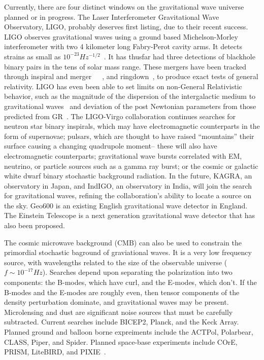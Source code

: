 Currently, there are four distinct windows on the gravitational wave universe planned or in progress. The Laser Interferometer Gravitational Wave Observatory, LIGO, probably deserves first listing, due to their recent success. LIGO observes gravitational waves using a ground based Michelson-Morley interferometer with two 4 kilometer long Fabry-Perot cavity arms. It detects strains as small as $10^{-23} Hz^{-1/2}$~\cite{LIGOsensitivity}. It has thusfar had three detections of blackhole binary pairs in the tens of solar mass range. These mergers have been tracked through inspiral and merger~\cite{GW150914}~\cite{GW151226}~\cite{GW170104}, and ringdown~\cite{LIGO1e}, to produce exact tests of general relativity. LIGO has even been able to set limits on non-General Relativistic behavior, such as the magnitude of the dispersion of the intergalactic medium to gravitational waves~\cite{GW170104} and deviation of the post Newtonian parameters from those predicted from GR~\cite{LIGO1e}. The LIGO-Virgo collaboration continues searches for neutron star binary inspirals, which may have electromagnetic counterparts in the form of supernovae; pulsars, which are thought to have raised ``mountains'' their surface causing a changing quadrupole moment-- these will also have electromagnetic counterparts; gravitational wave bursts correlated with EM, neutrino, or particle sources such as a gamma ray burst; or the cosmic or galactic white dwarf binary stochastic background radiation. In the future, KAGRA, an observatory in Japan, and IndIGO, an observatory in India, will join the search for gravitational waves, refining the collaboration's ability to locate a source on the sky. Geo600 is an existing English gravitational wave detector in England. The Einstein Telescope is a next generation gravitational wave detector that has also been proposed. 


The cosmic microwave background (CMB) can also be used to constrain the primordial stochastic baground of graviational waves. It is a very low frequency source, with wavelengths related to the size of the observable universe ($f\sim 10^{-17} Hz$). Searches depend upon separating the polarization into two components: the B-modes, which have curl, and the E-modes, which don't. If the B-modes and the E-modes are roughly even, then tensor components of the density perturbation dominate, and gravitational waves may be present. Microlensing and dust are significant noise sources that must be carefully subtracted. Current searches include BICEP2, Planck, and the Keck Array. Planned ground and balloon borne expreiments include the ACTPol, Polarbear, CLASS, Piper, and Spider. Planned space-base experiments include COrE, PRISM, LiteBIRD, and PIXIE~\cite{bmodes}. 


